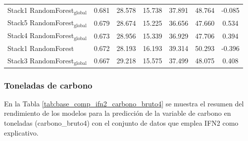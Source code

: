 \begin{table}
{\begin{tabular}{p{4.5cm}cccccc}
        Stack1 RandomForest$_{\text{global}}$ & 0.681 & 28.578 & 15.738 & 37.891 & 48.764 & -0.085 \\
        Stack5 RandomForest$_{\text{global}}$ & 0.679 & 28.674 & 15.225 & 36.656 & 47.660 & 0.534 \\
        Stack4 RandomForest$_{\text{global}}$ & 0.673 & 28.956 & 15.339 & 36.929 & 47.706 & 0.394 \\
        Stack1 RandomForest & 0.672 & 28.193 & 16.193 & 39.314 & 50.293 & -0.396 \\
        Stack3 RandomForest$_{\text{global}}$ & 0.667 & 29.218 & 15.575 & 37.499 & 48.075 & 0.408 \\
            \bottomrule
    \end{tabular}
    }
\end{table}

\subsubsection{Toneladas de carbono}


En la Tabla \ref{tab:base_comp_ifn2_carbono_bruto4} se muestra el resumen del rendimiento de los modelos para la predicción de la variable de carbono en toneladas (carbono\_bruto4) con el conjunto de datos que emplea IFN2 como explicativo.

